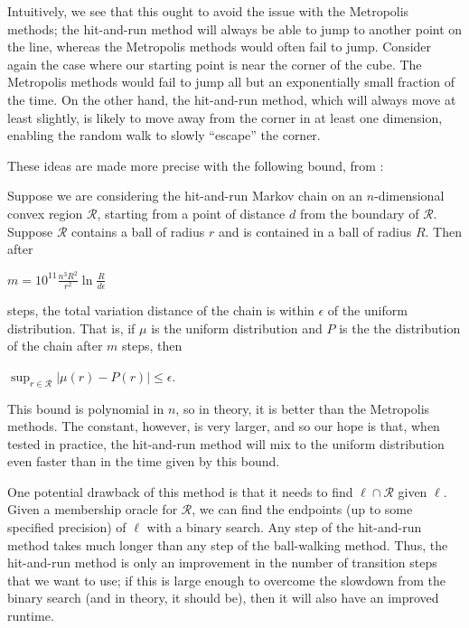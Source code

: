 \documentclass[11pt]{article}
\begin{document}
Intuitively, we see that this ought to avoid the issue with the Metropolis methods; the hit-and-run method will always be able to jump to another point on the line, whereas the Metropolis methods would often fail to jump. Consider again the case where our starting point is near the corner of the cube. The Metropolis methods would fail to jump all but an exponentially small fraction of the time. On the other hand, the hit-and-run method, which will always move at least slightly, is likely to move away from the corner in at least one dimension, enabling the random walk to slowly ``escape'' the corner.

These ideas are made more precise with the following bound, from \cite{Vempala}:

\begin{theorem} \label{hitandrunbound} Suppose we are considering the hit-and-run Markov chain on an $n$-dimensional convex region $\mathcal{R}$, starting from a point of distance $d$ from the boundary of $\mathcal{R}$. Suppose $\mathcal{R}$ contains a ball of radius $r$ and is contained in a ball of radius $R$. Then after
\begin{center}$m = \displaystyle 10^{11}\frac{n^3 R^2}{r^2}\ln\frac{R}{d\epsilon}$\end{center}
steps, the total variation distance of the chain is within $\epsilon$ of the uniform distribution. That is, if $\mu$ is the uniform distribution and $P$ is the the distribution of the chain after $m$ steps, then
\begin{center}$\displaystyle \sup_{r \in \mathcal{R}} |\mu(r) - P(r)| \le \epsilon$.\end{center}
\end{theorem}

This bound is polynomial in $n$, so in theory, it is better than the Metropolis methods. The constant, however, is very larger, and so our hope is that, when tested in practice, the hit-and-run method will mix to the uniform distribution even faster than in the time given by this bound.

One potential drawback of this method is that it needs to find $\ell \cap \mathcal{R}$ given $\ell$. Given a membership oracle for $\mathcal{R}$, we can find the endpoints (up to some specified precision) of $\ell$ with a binary search. Any step of the hit-and-run method takes much longer than any step of the ball-walking method. Thus, the hit-and-run method is only an improvement in the number of transition steps that we want to use; if this is large enough to overcome the slowdown from the binary search (and in theory, it should be), then it will also have an improved runtime.
\end{document}
